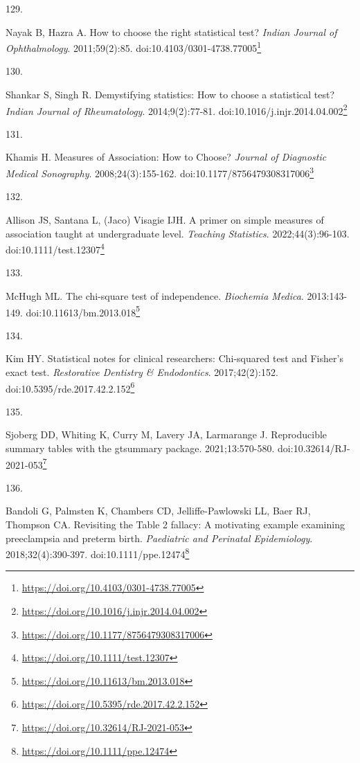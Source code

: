 \documentclass[
  a4paper,
]{book}
\newlength{\cslhangindent}
\newlength{\csllabelwidth}
\newlength{\cslentryspacingunit} %
\newenvironment{CSLReferences}[2] %
 {%
  \setlength{\parindent}{0pt}
  \ifodd #1
  \let\oldpar\par
  \def\par{\hangindent=\cslhangindent\oldpar}
  \fi
  \setlength{\parskip}{#2\cslentryspacingunit}
 }%
 {}
\newcommand{\CSLLeftMargin}[1]{\parbox[t]{\csllabelwidth}{#1}}
\newcommand{\CSLRightInline}[1]{\parbox[t]{\linewidth - \csllabelwidth}{#1}\break}
\renewcommand{\href}[2]{#2\footnote{\url{#1}}}
\begin{document}
\begin{CSLReferences}{0}{0}
\leavevmode{}%
\CSLLeftMargin{129. }%
\CSLRightInline{Nayak B, Hazra A. How to choose the right statistical test? \emph{Indian Journal of Ophthalmology}. 2011;59(2):85. doi:\href{https://doi.org/10.4103/0301-4738.77005}{10.4103/0301-4738.77005}}

\leavevmode{}%
\CSLLeftMargin{130. }%
\CSLRightInline{Shankar S, Singh R. Demystifying statistics: How to choose a statistical test? \emph{Indian Journal of Rheumatology}. 2014;9(2):77-81. doi:\href{https://doi.org/10.1016/j.injr.2014.04.002}{10.1016/j.injr.2014.04.002}}

\leavevmode{}%
\CSLLeftMargin{131. }%
\CSLRightInline{Khamis H. Measures of Association: How to Choose? \emph{Journal of Diagnostic Medical Sonography}. 2008;24(3):155-162. doi:\href{https://doi.org/10.1177/8756479308317006}{10.1177/8756479308317006}}

\leavevmode{}%
\CSLLeftMargin{132. }%
\CSLRightInline{Allison JS, Santana L, (Jaco) Visagie IJH. A primer on simple measures of association taught at undergraduate level. \emph{Teaching Statistics}. 2022;44(3):96-103. doi:\href{https://doi.org/10.1111/test.12307}{10.1111/test.12307}}

\leavevmode{}%
\CSLLeftMargin{133. }%
\CSLRightInline{McHugh ML. The chi-square test of independence. \emph{Biochemia Medica}. 2013:143-149. doi:\href{https://doi.org/10.11613/bm.2013.018}{10.11613/bm.2013.018}}

\leavevmode{}%
\CSLLeftMargin{134. }%
\CSLRightInline{Kim HY. Statistical notes for clinical researchers: Chi-squared test and Fisher's exact test. \emph{Restorative Dentistry \& Endodontics}. 2017;42(2):152. doi:\href{https://doi.org/10.5395/rde.2017.42.2.152}{10.5395/rde.2017.42.2.152}}

\leavevmode{}%
\CSLLeftMargin{135. }%
\CSLRightInline{Sjoberg DD, Whiting K, Curry M, Lavery JA, Larmarange J. Reproducible summary tables with the gtsummary package. 2021;13:570-580. doi:\href{https://doi.org/10.32614/RJ-2021-053}{10.32614/RJ-2021-053}}

\leavevmode{}%
\CSLLeftMargin{136. }%
\CSLRightInline{Bandoli G, Palmsten K, Chambers CD, Jelliffe-Pawlowski LL, Baer RJ, Thompson CA. Revisiting the Table 2 fallacy: A motivating example examining preeclampsia and preterm birth. \emph{Paediatric and Perinatal Epidemiology}. 2018;32(4):390-397. doi:\href{https://doi.org/10.1111/ppe.12474}{10.1111/ppe.12474}}


\end{CSLReferences}
\end{document}
